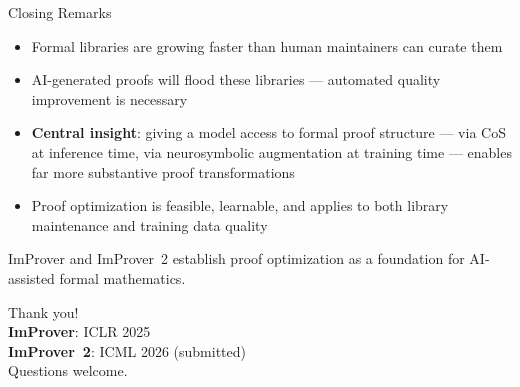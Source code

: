 \documentclass{beamer}
\begin{document}
\begin{frame}{Closing Remarks}
\vspace{0.2em}
\begin{itemize}\setlength{\itemsep}{4pt}
  \item Formal libraries are growing faster than human maintainers can curate them
  \item AI-generated proofs will flood these libraries --- automated quality improvement is necessary
  \item \textbf{Central insight}: giving a model access to formal proof structure --- via CoS at inference time, via neurosymbolic augmentation at training time --- enables far more substantive proof transformations
  \item Proof optimization is feasible, learnable, and applies to both library maintenance and training data quality
\end{itemize}
\vspace{0.2em}
\begin{exampleblock}{}
  \centering\small ImProver and ImProver~2 establish proof optimization as a foundation for AI-assisted formal mathematics.
\end{exampleblock}
\end{frame}

\begin{frame}[standout]
\centering
\Large Thank you!\\[0.8em]
\normalsize
\textbf{ImProver}: ICLR 2025\\[0.3em]
\textbf{ImProver~2}: ICML 2026 (submitted)\\[0.8em]
\small Questions welcome.
\end{frame}
\end{document}
